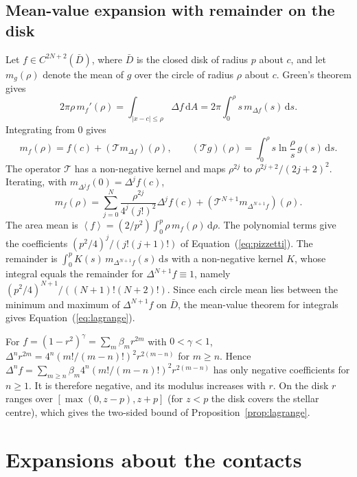 \documentclass[11pt]{article}
\newcommand{\avg}[1]{\left\langle #1 \right\rangle}
\newcommand{\dd}{\mathrm{d}}
\begin{document}
\subsection{Mean-value expansion with remainder on the disk} \label{app:pizzetti}

Let $f\in C^{2N+2}(\bar D)$, where $\bar D$ is the closed disk of radius $p$ about $c$, and let $m_g(\rho)$ denote the mean of $g$ over the circle of radius $\rho$ about $c$. Green's theorem gives
\begin{equation}
2\pi\rho\,m_f'(\rho)=\int_{|x-c|\le\rho}\Delta f\,\dd A=2\pi\int_0^\rho s\,m_{\Delta f}(s)\,\dd s .
\end{equation}
Integrating from $0$ gives
\begin{equation}
m_f(\rho)=f(c)+(\mathcal{T}m_{\Delta f})(\rho),\qquad(\mathcal{T}g)(\rho)=\int_0^\rho s\ln\frac{\rho}{s}\,g(s)\,\dd s .
\end{equation}
The operator $\mathcal{T}$ has a non-negative kernel and maps $\rho^{2j}$ to $\rho^{2j+2}/(2j+2)^2$. Iterating, with $m_{\Delta^jf}(0)=\Delta^jf(c)$,
\begin{equation}
m_f(\rho)=\sum_{j=0}^{N}\frac{\rho^{2j}}{4^j(j!)^2}\Delta^jf(c)+(\mathcal{T}^{N+1}m_{\Delta^{N+1}f})(\rho).
\end{equation}
The area mean is $\avg{f}=(2/p^2)\int_0^p\rho\,m_f(\rho)\,\dd\rho$. The polynomial terms give the coefficients $(p^2/4)^j/(j!(j+1)!)$ of Equation~(\ref{eq:pizzetti}). The remainder is $\int_0^pK(s)\,m_{\Delta^{N+1}f}(s)\,\dd s$ with a non-negative kernel $K$, whose integral equals the remainder for $\Delta^{N+1}f\equiv1$, namely $(p^2/4)^{N+1}/((N+1)!(N+2)!)$. Since each circle mean lies between the minimum and maximum of $\Delta^{N+1}f$ on $\bar D$, the mean-value theorem for integrals gives Equation~(\ref{eq:lagrange}).

For $f=(1-r^2)^\gamma=\sum_m\beta_m r^{2m}$ with $0<\gamma<1$, $\Delta^n r^{2m}=4^n\left(m!/(m-n)!\right)^2r^{2(m-n)}$ for $m\ge n$. Hence $\Delta^nf=\sum_{m\ge n}\beta_m4^n(m!/(m-n)!)^2r^{2(m-n)}$ has only negative coefficients for $n\ge1$. It is therefore negative, and its modulus increases with $r$. On the disk $r$ ranges over $[\max(0,z-p),z+p]$ (for $z<p$ the disk covers the stellar centre), which gives the two-sided bound of Proposition~\ref{prop:lagrange}.


\section{Expansions about the contacts} \label{sec:contactexp}
\end{document}
